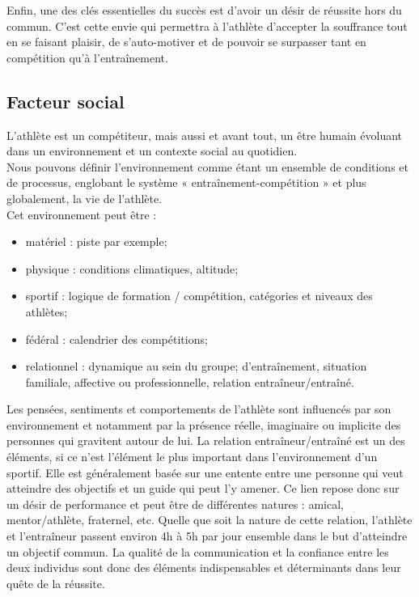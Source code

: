             Enfin, une des clés essentielles du succès est d'avoir un désir de réussite hors du commun. C'est cette envie qui permettra à l'athlète d'accepter la souffrance tout en se faisant plaisir, de s'auto-motiver et de pouvoir se surpasser tant en compétition qu'à l'entraînement.\\
            
                
        \subsection{Facteur social}
            
            L'athlète est un compétiteur, mais aussi et avant tout, un être humain évoluant dans un environnement et un contexte social au quotidien.\\
            
            Nous pouvons définir l’environnement comme étant un ensemble de conditions et de processus, englobant le système « entraînement-compétition » et plus globalement, la vie de l'athlète. \\
            
            Cet environnement peut être : 
            \begin{itemize}
                \item matériel : piste par exemple;
                \item physique : conditions climatiques, altitude;
                \item sportif : logique de formation / compétition, catégories et niveaux des athlètes;
                \item fédéral : calendrier des compétitions;
                \item relationnel : dynamique au sein du groupe; d’entraînement, situation familiale, affective ou professionnelle, relation entraîneur/entraîné.\\
            \end{itemize}

            Les pensées, sentiments et comportements de l'athlète sont influencés par son environnement et notamment par la présence réelle, imaginaire ou implicite des personnes qui gravitent autour de lui. La relation entraîneur/entraîné est un des éléments, si ce n'est l'élément le plus important dans l'environnement d'un sportif. Elle est généralement basée sur une entente entre une personne qui veut atteindre des objectifs et un guide qui peut l’y amener. Ce lien repose donc sur un désir de performance et peut être de différentes natures : amical, mentor/athlète, fraternel, etc. Quelle que soit la nature de cette relation, l'athlète et l'entraîneur passent environ 4h à 5h par jour ensemble dans le but d'atteindre un objectif commun. La qualité de la communication et la confiance entre les deux individus sont donc des éléments indispensables et déterminants dans leur quête de la réussite.\\
            
